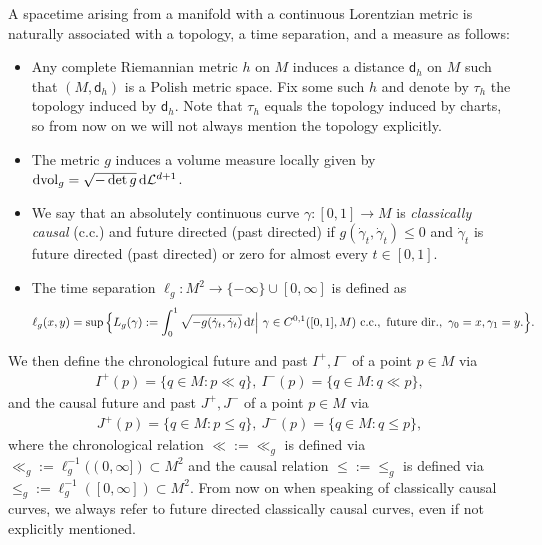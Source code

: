 \documentclass[a4paper,10pt]{article}
\numberwithin{equation}{section}
\newcommand{\vol}{\mathrm{vol}}
\newcommand{\sfd}{\mathsf d}
\newcommand{\di}{{\rm d}}
\begin{document}
A spacetime arising from a manifold with a continuous Lorentzian metric is naturally associated with a topology, a time separation, and a measure as follows:
\begin{itemize}
    \item Any complete Riemannian metric $h$ on $M$ induces a distance $\sfd_h$ on $M$ such that $(M, \sfd_h)$ is a Polish metric space. Fix some such $h$ and denote by $\tau_h$ the topology induced by $\sfd_h$. Note that $\tau_h$ equals the topology induced by charts, so from now on we will not always mention the topology explicitly.  
    \item The metric $g$ induces a volume measure locally given by $\di \vol_g = \sqrt{-\det g}\, \di \mathcal{L}^{d+1}$.
    \item We say that an absolutely continuous curve $\gamma\colon[0,1] \to M$ is \emph{classically causal} (c.c.) and future directed (past directed) if $g(\dot{\gamma}_t,\dot{\gamma}_t) \leq 0$ and $\dot{\gamma}_t$ is future directed (past directed) or zero for almost every $t \in [0,1]$. 
    \item The time separation $\ell_g:M^2\to \{-\infty\}\cup [0, \infty]$ is defined as
    \begin{align}
        \ell_g(x, y) = \sup  \Big\{ L_g(\gamma):=\int_0^1\sqrt{-g(\dot{\gamma}_t,\dot{\gamma}_t)}\, \di t\Big|\ \gamma \in C^{0,1}([0,1], M)\ \mathrm{c.c., \ future \ dir.},\ \gamma_0=x, \gamma_1=y.   \Big\}. 
    \end{align}
\end{itemize}
We then define the chronological future and past $I^+, I^-$ of a point $p \in M$ via
\begin{align*}
    I^+(p) = \{q \in M: p \ll q\}, \ I^-(p) = \{q \in M: q \ll p\},
\end{align*} 
and the causal future and past $J^+, J^-$ of a point $p \in M$ via
\begin{align*}
    J^+(p) = \{q \in M: p \leq q\}, \ J^-(p) = \{q \in M: q \leq p\},
\end{align*} 
where the chronological relation $\ll:=\ll_g$ is defined via $\ll_g := \ell_g^{-1}((0, \infty]) \subset M^2$ and the causal relation $\leq := \leq_g$ is defined via $\leq_g := \ell_g^{-1}([0, \infty]) \subset M^2$. From now on when speaking of classically causal curves, we always refer to future directed classically causal curves, even if not explicitly mentioned.
\smallskip
\end{document}
